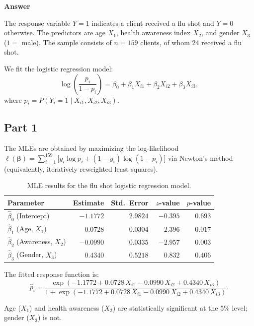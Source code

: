 \documentclass[letterpaper]{article}
\begin{document}
	\textbf{Answer}
	

		The response variable $Y = 1$ indicates a client received a flu shot and
		$Y = 0$ otherwise. The predictors are age $X_1$, health awareness index
		$X_2$, and gender $X_3$ ($1 = $ male). The sample consists of $n = 159$
		clients, of whom 24 received a flu shot.
		
		We fit the logistic regression model:
		\[
		\log\!\left(\frac{p_i}{1-p_i}\right)
		= \beta_0 + \beta_1 X_{i1} + \beta_2 X_{i2} + \beta_3 X_{i3},
		\]
		where $p_i = P(Y_i = 1 \mid X_{i1}, X_{i2}, X_{i3})$.
		
		\subsection{Part 1}
		
		The MLEs are obtained by maximizing the log-likelihood
		$\ell(\boldsymbol{\beta}) = \sum_{i=1}^{159}\bigl[y_i \log p_i + (1-y_i)\log(1-p_i)\bigr]$
		via Newton's method (equivalently, iteratively reweighted least squares).
		
		\begin{table}[H]
			\centering
			\begin{tabular}{lrrrr}
				\toprule
				Parameter & Estimate & Std.\ Error & $z$-value & $p$-value \\
				\midrule
				$\hat{\beta}_0$ (Intercept) & $-1.1772$ & $2.9824$ & $-0.395$ & $0.693$ \\
				$\hat{\beta}_1$ (Age, $X_1$) & $\phantom{-}0.0728$ & $0.0304$ & $\phantom{-}2.396$ & $0.017$ \\
				$\hat{\beta}_2$ (Awareness, $X_2$) & $-0.0990$ & $0.0335$ & $-2.957$ & $0.003$ \\
				$\hat{\beta}_3$ (Gender, $X_3$) & $\phantom{-}0.4340$ & $0.5218$ & $\phantom{-}0.832$ & $0.406$ \\
				\bottomrule
			\end{tabular}
			\caption{MLE results for the flu shot logistic regression model.}
		\end{table}
		
		The fitted response function is:
		\[
		\hat{p}_i
		= \frac{\exp(-1.1772 + 0.0728\,X_{i1} - 0.0990\,X_{i2} + 0.4340\,X_{i3})}
		{1 + \exp(-1.1772 + 0.0728\,X_{i1} - 0.0990\,X_{i2} + 0.4340\,X_{i3})}.
		\]
		
		Age ($X_1$) and health awareness ($X_2$) are statistically significant at
		the 5\% level; gender ($X_3$) is not.
		
\end{document}
